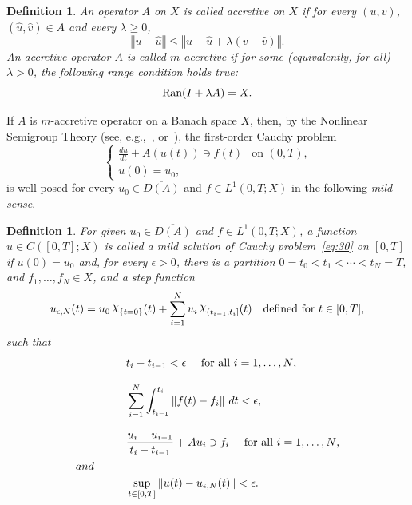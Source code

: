 \documentclass[reqno,12pt]{amsart}
\newtheorem{definition}[theorem]{Definition}
\newcommand{\norm}[1]{\left\Vert #1 \right\Vert} %
\def\1{\raisebox{2pt}{\rm{$\chi$}}} %
\numberwithin{equation}{section} %
\begin{document}
\begin{definition}\label{def:quasi-accretive}\rm
  An operator $A$ on $X$ is called
 accretive  on $X$
  if for every $(u,v)$,
  $(\hat{u},\hat{v})\in A$ and every $\lambda\ge 0$,
  \begin{displaymath}
    \norm{u-\hat{u}}\le \norm{u-\hat{u}+\lambda (v-\hat{v})}.
  \end{displaymath}
   An accretive operator $A$ is called {\it $m$-accretive}  if for some (equivalently, for all) $\lambda>0$, the following \emph{range condition} holds true:
  \begin{equation}
    \label{eq:29}
    \hbox{Ran}(I+\lambda A)=X.
  \end{equation}
\end{definition}


If $A$ is  $m$-accretive operator on a Banach space $X$, then, by the
 Nonlinear Semigroup Theory (see, e.g.,~\cite[Theorem~6.5]{Benilanbook},
or~\cite[Corollary~4.2]{Bar10}), the first-order Cauchy problem
\begin{equation}
  \label{eq:30}
  \begin{cases}
    \displaystyle\frac{d u}{dt}+A(u(t))\ni f(t) &\text{on $(0,T)$,}\\[8pt]
     \displaystyle u(0)=u_{0},
  \end{cases}
\end{equation}
is well-posed for every $u_{0}\in \overline{D(A)}$  and
$f\in L^{1}(0,T;X)$  in the following \emph{mild sense}.


\begin{definition}\label{def:mild}\rm 
  For given $u_{0}\in \overline{D(A)}$ and
  $f\in L^{1}(0,T;X)$, a function $u\in C([0,T];X)$ is called a
 mild solution of Cauchy problem~\eqref{eq:30}  on $[0,T]$ if $u(0)=u_{0}$
and, for every
$\epsilon>0$, there is a partition
$0=t_{0}<t_{1}<\cdots < t_{N}=T$, and $f_1, \ldots , f_N \in X$, and a  step
  function
  \begin{displaymath}
    u_{\epsilon,N}(t)=u_{0}\,\1_{\{t=0\}}(t)+\sum_{i=1}^{N}u_{i}\,\1_{(t_{i-1},t_{i}]}(t)
    \quad\text{defined for  $t\in [0,T]$,}
  \end{displaymath}
 such that
  \begin{align*}
   &t_{i}-t_{i-1}<\epsilon\quad\text{ for all $i=1,\dots,N$,}\\[8pt]
    &\sum_{i=1}^{N}\int_{t_{i-1}}^{t_{i}}\norm{f(t)-f_{i}}\,dt<\epsilon,\\[8pt]
   & \frac{u_{i}-u_{i-1}}{t_{i}-t_{i-1}}+A u_{i}\ni
                   f_{i}
                   \quad\text{ for all $i=1,\dots,N$,}\\
  and \hspace{1cm}& \hfill \\
       & \sup_{t\in [0,T]}\norm{u(t)-u_{\epsilon,N}(t)}<\epsilon.
  \end{align*}
\end{definition}
\end{document}
